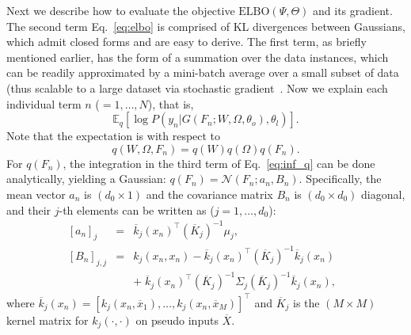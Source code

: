 \documentclass[conference]{IEEEtran}
\begin{document}
Next we describe how to evaluate the objective $\textrm{ELBO}(\Psi, \Theta)$ 
and its gradient. The second term Eq.~\ref{eq:elbo} is comprised of KL divergences between Gaussians, which admit closed forms and are easy to derive. 
The first term, as briefly mentioned earlier, has the form of a summation over 
the data instances, which can be readily approximated by a mini-batch 
average over a small subset of data (thus scalable to a large dataset via 
stochastic gradient~\cite{ranganath2014black}. Now we explain each individual term $n$ ($=1,\dots,N$), that is,
\begin{equation}
\mathbb{E}_q [ \log P(y_n|G(F_n; W, \Omega, \theta_o), \theta_l)].
\label{eq:ell_n}
\end{equation}
Note that the expectation is with respect to $$q(W, \Omega, F_n) = 
q(W) q(\Omega) q(F_n).$$ For $q(F_n)$, the integration in the third term of 
Eq.~\ref{eq:inf_q} can be done analytically, yielding a Gaussian: 
$q(F_n) = \mathcal{N}(F_n; a_n, B_n)$. %
Specifically, the mean vector $a_n$ is $(d_0 \times 1)$ and the covariance 
matrix $B_n$ is $(d_0 \times d_0)$ diagonal, and their $j$-th elements can 
be written as ($j=1,\dots,d_0$): 
\begin{eqnarray}
{[a_n]}_j &=&    \label{eq:qF_anj}
    \overline{k}_j(x_n)^\top (\overline{K}_j)^{-1} \mu_j, \\
{[B_n]}_{j,j} &=&    \label{eq:qF_Bnj}
    k_j(x_n,x_n) - 
    \overline{k}_j(x_n)^\top (\overline{K}_j)^{-1} \overline{k}_j(x_n) \\&&+  
     \;\overline{k}_j(x_n)^\top (\overline{K}_j)^{-1} \Sigma_j 
        (\overline{K}_j)^{-1} \overline{k}_j(x_n), \ \ \
\end{eqnarray}
where $\overline{k}_j(x_n) = 
[ k_j(x_n,\overline{x}_1), \dots, k_j(x_n,\overline{x}_M) ]^\top$ and 
$\overline{K}_j$ is the $(M \times M)$ kernel matrix for $k_j(\cdot,\cdot)$ 
on pseudo inputs $\overline{X}$.
\end{document}
